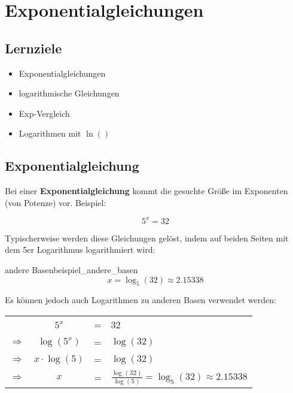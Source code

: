 

\section{Exponentialgleichungen}

\subsection*{Lernziele}

\begin{itemize}
\item Exponentialgleichungen
  \item logarithmische Gleichungen 
\item Exp-Vergleich
\item Logarithmen mit $\ln()$
\end{itemize}

\subsection{Exponentialgleichung}
Bei einer \textbf{Exponentialgleichung} kommt die gesuchte Größe im
Exponenten (von Potenze) vor. Beispiel:

$$5^x = 32$$

Typischerweise werden diese Gleichungen gelöst, indem auf beiden
Seiten mit dem 5er Logarithmus logarithmiert wird:

\begin{beispiel}{andere Basen}{beispiel_andere_basen}
$$x=\log_5(32) \approx 2.15338$$

Es können jedoch auch Logarithmen zu anderen Basen verwendet werden:

\begin{tabular}{rccl}
  \             & $5^x$           &=&    32          \\
  $\Rightarrow$ & $\log(5^x)$     &=&  $\log(32)$     \\
  $\Rightarrow$ & $x\cdot\log(5)$ &=&  $\log(32)$     \\
  $\Rightarrow$ & $x$             &=&  $\frac{\log(32)}{\log(5)} = \log_5(32) \approx 2.15338$ 
\end{tabular}
\end{beispiel}
\newpage

